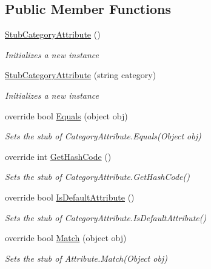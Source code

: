 \subsection*{Public Member Functions}
\begin{DoxyCompactItemize}
\item 
\hyperlink{class_system_1_1_component_model_1_1_fakes_1_1_stub_category_attribute_af1e795618fe31bd0827244c21dfdd07f}{Stub\-Category\-Attribute} ()
\begin{DoxyCompactList}\small\item\em Initializes a new instance\end{DoxyCompactList}\item 
\hyperlink{class_system_1_1_component_model_1_1_fakes_1_1_stub_category_attribute_ae4335889f58930a771c10177836bb68b}{Stub\-Category\-Attribute} (string category)
\begin{DoxyCompactList}\small\item\em Initializes a new instance\end{DoxyCompactList}\item 
override bool \hyperlink{class_system_1_1_component_model_1_1_fakes_1_1_stub_category_attribute_ae5a403f11fa1859f27ec1c029bf88f75}{Equals} (object obj)
\begin{DoxyCompactList}\small\item\em Sets the stub of Category\-Attribute.\-Equals(\-Object obj)\end{DoxyCompactList}\item 
override int \hyperlink{class_system_1_1_component_model_1_1_fakes_1_1_stub_category_attribute_a749947c96211b055cbf852e22ee935d5}{Get\-Hash\-Code} ()
\begin{DoxyCompactList}\small\item\em Sets the stub of Category\-Attribute.\-Get\-Hash\-Code()\end{DoxyCompactList}\item 
override bool \hyperlink{class_system_1_1_component_model_1_1_fakes_1_1_stub_category_attribute_a8a51e23637fe04a125c11b27badff09a}{Is\-Default\-Attribute} ()
\begin{DoxyCompactList}\small\item\em Sets the stub of Category\-Attribute.\-Is\-Default\-Attribute()\end{DoxyCompactList}\item 
override bool \hyperlink{class_system_1_1_component_model_1_1_fakes_1_1_stub_category_attribute_af26b801400568e89a18aae548a40084d}{Match} (object obj)
\begin{DoxyCompactList}\small\item\em Sets the stub of Attribute.\-Match(\-Object obj)\end{DoxyCompactList}\end{DoxyCompactItemize}
